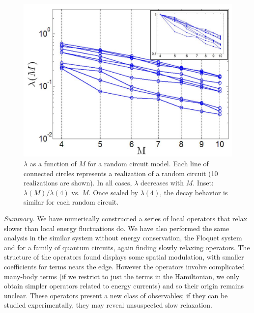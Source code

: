 \documentclass[twocolumn,superscriptaddress, prb]{revtex4-1}
\begin{document}
\begin{figure}
\includegraphics[width=1.0\linewidth]{random_circuit.pdf}
\centering
\caption{$\lambda$ as a function of $M$ for a random circuit model. Each line of connected circles represents a realization of a random circuit (10 realizations are shown). In all cases, $\lambda$ decreases with $M$. Inset: $\lambda(M)/\lambda(4)$ vs. $M$. Once scaled by $\lambda(4)$, the decay behavior is similar for each random circuit. }
\label{fig:lz}
\end{figure}



{\it Summary.}
We have numerically constructed a series of local operators that relax slower than local energy fluctuations do.
We have also performed the same analysis in the similar system without energy conservation,
the Floquet system and for a family of quantum circuits, again finding slowly relaxing operators.
The structure of the operators found displays some spatial modulation, with smaller coefficients for terms nears the edge.  However the operators involve complicated many-body terms (if we restrict to just the terms in the Hamiltonian, we only obtain simpler operators related to energy currents) and so their origin remains unclear.
These operators present a new class of observables; if they can be studied experimentally, they may reveal unsuspected slow relaxation.

\end{document}
